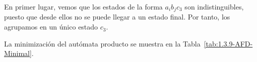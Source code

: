 \begin{ejercicio}
    En primer lugar, vemos que los estados de la forma $a_ib_jc_3$ son indistinguibles, puesto que desde ellos no se puede llegar a un estado final. Por tanto, los agrupamos en un único estado $c_3$.

    La minimización del autómata producto se muestra en la Tabla~\ref{tab:1.3.9-AFD-Minimal}.
    \begin{table}
        \centering
\end{table}
\end{ejercicio}
